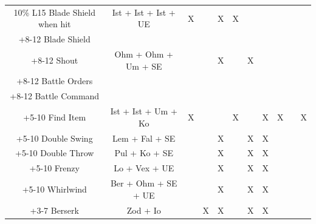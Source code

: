 \documentclass[12pt,a4paper]{article}
\begin{document}
\begin{center}
{\begin{tabular}{|c|c|c|c|c|c|c|c|c|c|c|}
\hline
10\% L15 Blade Shield when hit&Ist + Ist + Ist + UE&X&&X&X&&&&&\\
+8-12 Blade Shield&&&&&&&&&&\\
\hline
+8-12 Shout&Ohm + Ohm + Um + SE&&&X&&X&&&&\\
+8-12 Battle Orders&&&&&&&&&&\\
+8-12 Battle Command&&&&&&&&&&\\
\hline
+5-10 Find Item&Ist + Ist + Um + Ko&X&&&X&&X&X&&X\\
\hline
+5-10 Double Swing&Lem + Fal + SE&&&X&&X&X&&&\\
\hline
+5-10 Double Throw&Pul + Ko + SE&&&X&&X&X&&&\\
\hline
+5-10 Frenzy&Lo + Vex + UE&&&X&&X&X&&&\\
\hline
+5-10 Whirlwind&Ber + Ohm + SE + UE&&&X&&X&X&&&\\
\hline
+3-7 Berserk&Zod + Io&&X&X&&X&X&&&\\
\hline
\end{tabular}
}
\end{center}
\end{document}
